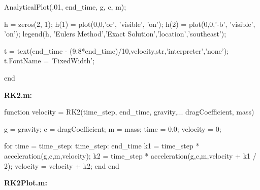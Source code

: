 \documentclass[12pt]{article}
\begin{document}
\begin{verbatimtab}
    AnalyticalPlot(.01, end_time, g, c, m);
    
    h = zeros(2, 1);                          %
    h(1) = plot(0,0,'or', 'visible', 'on');   %
    h(2) = plot(0,0,'-b', 'visible', 'on');   %
    legend(h, 'Eulers Method','Exact Solution','location','southeast');%
    
    t = text(end_time - (9.8*end_time)/10,velocity,str,'interpreter','none');
    t.FontName = 'FixedWidth'; %
    

end
\end{verbatimtab}
\textbf{RK2.m:}
\begin{verbatimtab}
function velocity = RK2(time_step, end_time, gravity,... 
                        dragCoefficient, mass)
                    

    g = gravity;            %
    c = dragCoefficient;    %
    m = mass;               %
    time = 0.0;             %
    velocity = 0;           %
    
    for time = time_step: time_step: end_time
        k1 = time_step * acceleration(g,c,m,velocity);
        k2 = time_step * acceleration(g,c,m,velocity + k1 / 2);
        velocity = velocity + k2;
    end
end
\end{verbatimtab}
\textbf{RK2Plot.m:}
\end{document}
